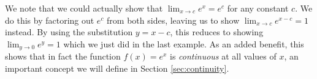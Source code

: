 We note that we could actually show that $\lim_{x\rightarrow c} e^x = e^c $ for any constant $c$.  We do this by factoring out $e^c$ from both sides, leaving us to show $\lim_{x\rightarrow c} e^{x-c} = 1 $ instead.  By using the substitution $y=x-c$, this reduces to showing $\lim_{y\rightarrow 0} e^y = 1 $ which we just did in the last example.  As an added benefit, this shows that in fact the function $f(x)=e^x$ is \textit{continuous} at all values of $x$, an important concept we will define in Section \ref{sec:continuity}.\\

{}
